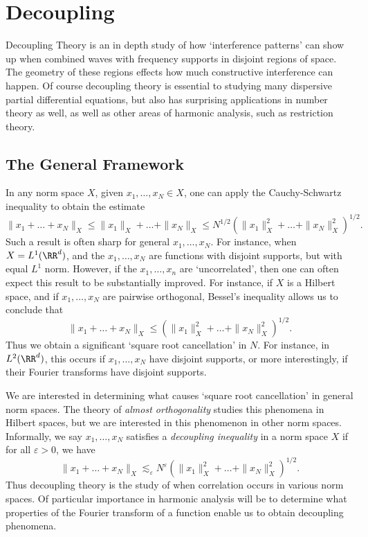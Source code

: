 
\part{Decoupling}

Decoupling Theory is an in depth study of how `interference patterns' can show up when combined waves with frequency supports in disjoint regions of space. The geometry of these regions effects how much constructive interference can happen. Of course decoupling theory is essential to studying many dispersive partial differential equations, but also has surprising applications in number theory as well, as well as other areas of harmonic analysis, such as restriction theory.








\chapter{The General Framework}

In any norm space $X$, given $x_1, \dots, x_N \in X$, one can apply the Cauchy-Schwartz inequality to obtain the estimate
%
\[ \| x_1 + \dots + x_N \|_X \leq \| x_1 \|_X + \dots + \| x_N \|_X \leq N^{1/2} \left( \| x_1 \|_X^2 + \dots + \| x_N \|_X^2 \right)^{1/2}. \]
%
Such a result is often sharp for general $x_1, \dots, x_N$. For instance, when $X = L^1(\RR^d)$, and the $x_1, \dots, x_N$ are functions with disjoint supports, but with equal $L^1$ norm. However, if the $x_1, \dots, x_n$ are `uncorrelated', then one can often expect this result to be substantially improved. For instance, if $X$ is a Hilbert space, and if $x_1, \dots, x_N$ are pairwise orthogonal, Bessel's inequality allows us to conclude that
%
\[ \| x_1 + \dots + x_N \|_X \leq \left( \| x_1 \|_X^2 + \dots + \| x_N \|_X^2 \right)^{1/2}. \]
%
Thus we obtain a significant `square root cancellation' in $N$. For instance, in $L^2(\RR^d)$, this occurs if $x_1, \dots, x_N$ have disjoint supports, or more interestingly, if their Fourier transforms have disjoint supports.

We are interested in determining what causes `square root cancellation' in general norm spaces. The theory of \emph{almost orthogonality} studies this phenomena in Hilbert spaces, but we are interested in this phenomenon in other norm spaces. Informally, we say $x_1, \dots, x_N$ satisfies a \emph{decoupling inequality} in a norm space $X$ if for all $\varepsilon > 0$, we have
%
\[ \| x_1 + \dots + x_N \|_X \lesssim_\varepsilon N^\varepsilon \left( \| x_1 \|_X^2 + \dots + \| x_N \|_X^2 \right)^{1/2}. \]
%
Thus decoupling theory is the study of when correlation occurs in various norm spaces. Of particular importance in harmonic analysis will be to determine what properties of the Fourier transform of a function enable us to obtain decoupling phenomena.

